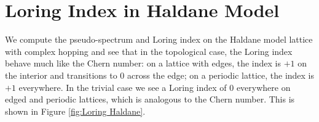 \documentclass[a4paper]{article}
\begin{document}
\section{Loring Index in Haldane Model}

We compute the pseudo-spectrum and Loring index on the Haldane model lattice with complex hopping and see that in the topological case, the Loring index behave much like the Chern number: on a lattice with edges, the index is $+1$ on the interior and transitions to 0 across the edge; on a periodic lattice, the index is $+1$ everywhere. In the trivial case we see a Loring index of 0 everywhere on edged and periodic lattices, which is analogous to the Chern number. This is shown in Figure \ref{fig:Loring Haldane}.
\begin{figure}
\centering
{}%
%


\end{figure}
\end{document}
